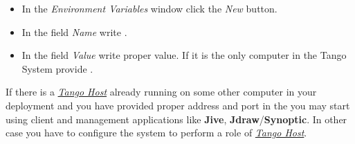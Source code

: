 \documentclass[letterpaper,10pt,english]{sphinxmanual}
\begin{document}
\begin{itemize}
\begin{description}
\begin{itemize}
\item {} 
In the \emph{Environment Variables} window click the \emph{New} button.

\item {} 
In the field \emph{Name} write .

\item {} 
In the field \emph{Value} write proper value. If it is the only computer in the Tango System provide .

\end{itemize}

\end{description}

\end{itemize}

If there is a {\hyperref[glossary:term-tango-host]{\emph{Tango Host}}} already running on some other computer in your deployment and you have provided proper
address and port in the  you may start using client and management applications like
\textbf{Jive}, \textbf{Jdraw}/\textbf{Synoptic}. In other case you have to configure the system to perform a role of
{\hyperref[glossary:term-tango-host]{\emph{Tango Host}}}.
\end{document}
